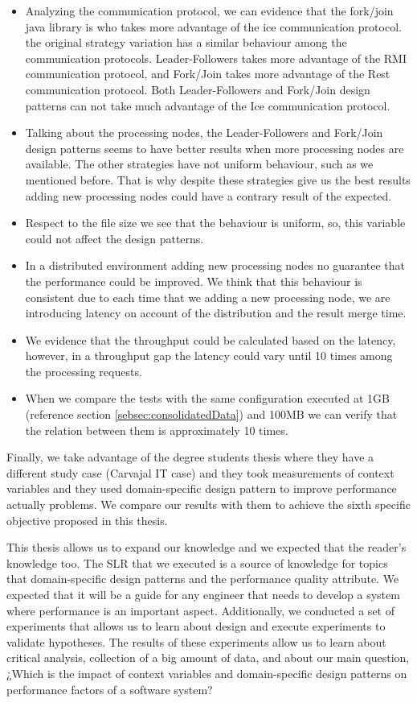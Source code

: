 \begin{itemize}
	\item  Analyzing the communication protocol, we can evidence that the fork/join java library is who takes more advantage of the ice communication protocol. the original strategy variation has a similar behaviour among the communication protocols. Leader-Followers takes more advantage of the RMI communication protocol, and Fork/Join takes more advantage of the Rest communication protocol. Both Leader-Followers and Fork/Join design patterns can not take much advantage of the Ice communication protocol.
	\item Talking about the processing nodes, the Leader-Followers and Fork/Join design patterns seems to have better results when more processing nodes are available. The other strategies have not uniform behaviour, such as we mentioned before. That is why despite these strategies give us the best results adding new processing nodes could have a contrary result of the expected.
	\item Respect to the file size we see that the behaviour is uniform, so, this variable could not affect the design patterns.
	\item In a distributed environment adding new processing nodes no guarantee that the performance could be improved. We think that this behaviour is consistent due to each time that we adding a new processing node, we are introducing latency on account of the distribution and the result merge time.
	\item  We evidence that the throughput could be calculated based on the latency, however, in a throughput gap the latency could vary until 10 times among the processing requests.
	\item When we compare the tests with the same configuration executed at 1GB (reference section \ref{sebsec:consolidatedData}) and 100MB we can verify that the relation between them is approximately 10 times.
\end{itemize}

Finally, we take advantage of the degree students thesis where they have a different study case (Carvajal IT case) and they took measurements of context variables and they used domain-specific design pattern to improve performance actually problems. We compare our results with them to achieve the sixth specific objective proposed in this thesis.

This thesis allows us to expand our knowledge and we expected that the reader's knowledge too. The SLR that we executed is a source of knowledge for topics that domain-specific design patterns and the performance quality attribute. We expected that it will be a guide for any engineer that needs to develop a system where performance is an important aspect. Additionally, we conducted a set of experiments that allows us to learn about design and execute experiments to validate hypotheses. The results of these experiments allow us to learn about critical analysis, collection of a big amount of data, and about our main question, ¿Which is the impact of context variables and domain-specific design patterns on performance factors of a software system?